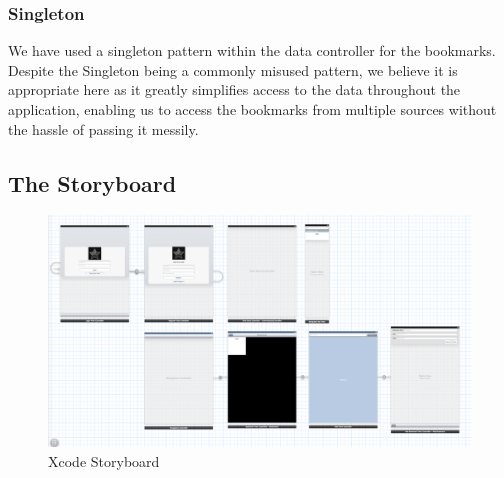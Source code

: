 \documentclass[a4wide, 10pt]{article}
\begin{document}
\subsubsection{Singleton}
We have used a singleton pattern within the data controller for the bookmarks. Despite the Singleton being a commonly misused pattern, we believe it is appropriate here as it greatly simplifies access to the data throughout the application, enabling us to access the bookmarks from multiple sources without the hassle of passing it messily. 

\subsection{The Storyboard}

\begin{figure}
	\centering	
	\includegraphics[width=\textwidth]{screenshots/Storyboard}
	\caption{Xcode Storyboard}
\end{figure}
\end{document}
